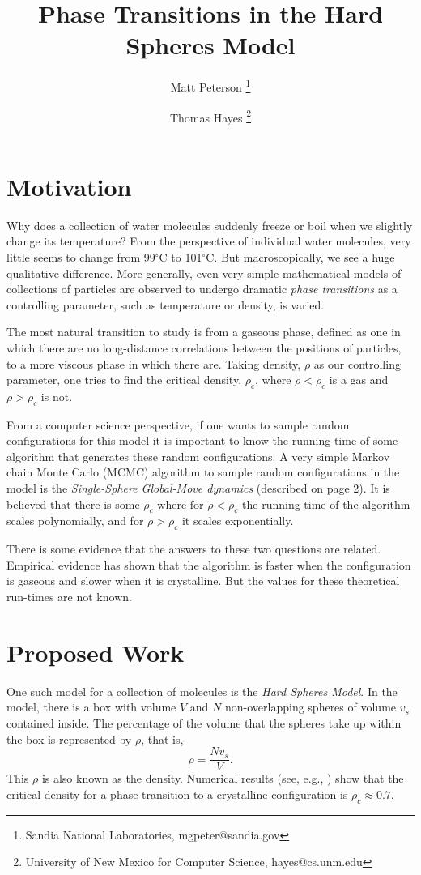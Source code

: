 \documentclass[a4paper,11pt]{article}
\title{Phase Transitions in the Hard Spheres Model}
\author{Matt Peterson \thanks{Sandia National Laboratories, mgpeter@sandia.gov} \and Thomas Hayes \thanks{University of New Mexico for Computer Science, hayes@cs.unm.edu}}
\begin{document}
\maketitle

\section*{Motivation}

Why does a collection of water molecules suddenly freeze or boil when we slightly change its temperature?  From the perspective of individual water molecules, very little seems to change from 99$^\circ$C to 101$^\circ$C.  But macroscopically, we see a huge qualitative difference.  More generally, even very simple mathematical models of collections of particles are observed to undergo dramatic \textit{phase transitions} as a controlling parameter, such as temperature or density, is varied.

The most natural transition to study is from a gaseous phase, defined as one in which there are no long-distance correlations between the positions of particles, to a more viscous phase in which there are.  Taking density, $\rho$ as our controlling parameter, one tries to find the critical density, $\rho_c$, where $\rho < \rho_c$ is a gas and $\rho > \rho_c$ is not.

From a computer science perspective, if one wants to sample random configurations for this model it is important to know the running time of some algorithm that generates these random configurations.  A very simple Markov chain Monte Carlo (MCMC) algorithm to sample random configurations in the model is the \textit{Single-Sphere Global-Move dynamics} (described on page 2).  It is believed that there is some $\rho_c$ where for $\rho < \rho_c$ the running time of the algorithm scales polynomially, and for $\rho > \rho_c$ it scales exponentially.

There is some evidence that the answers to these two questions are related.  Empirical evidence has shown that the algorithm is faster when the configuration is gaseous and slower when it is crystalline.  But the values for these theoretical run-times are not known.

\section*{Proposed Work}

One such model for a collection of molecules is the \textit{Hard Spheres Model}.  In the model, there is a box with volume $V$ and $N$ non-overlapping spheres of volume $v_s$ contained inside.  The percentage of the volume that the spheres take up within the box is represented by $\rho$, that is,
\begin{displaymath}
  \rho = \frac{Nv_s}{V}.
\end{displaymath}
This $\rho$ is also known as the density. Numerical results (see, e.g., \cite{Mak}\cite{Piasecki}) show that the critical density for a phase transition to a crystalline configuration is $\rho_c \approx 0.7$.
\end{document}
